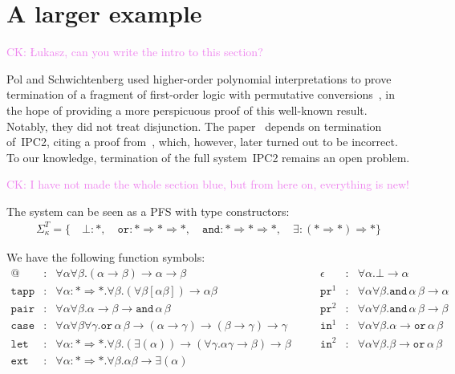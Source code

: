 \documentclass[a4paper,UKenglish,cleveref,autoref,numberwithinsect]{lipics-v2019}
\theoremstyle{definition}
\newcommand{\arrkind}{\Rightarrow}
\newcommand{\arrtype}{\rightarrow}
\newcommand{\proj}{\mathtt{pr}}
\newcommand{\CK}[1]{\textcolor{violet}{CK: #1}}
\begin{document}
\section{A larger example}\label{sec:examples}

\CK{\L ukasz, can you write the intro to this section?}

Pol and Schwichtenberg used higher-order polynomial interpretations to
prove termination of a fragment of first-order logic with permutative
conversions~\cite{PolSchwichtenberg1995}, in the hope of providing a
more perspicuous proof of this well-known result. Notably, they did
not treat disjunction. The paper~\cite{SorensenUrzyczyn2010} depends
on termination of~IPC2, citing a proof from~\cite{Wojdyga2008},
which, however, later turned out to be incorrect. To our knowledge,
termination of the full system~IPC2 remains an open problem.

\CK{I have not made the whole section blue, but from here on, everything
is new!}

The system can be seen as a PFS with type constructors:
\[
\begin{array}{c}
\Sigma^T_\kappa = \{\quad
  \bot : *,\quad
  \mathtt{or} : * \arrkind * \arrkind *,\quad
  \mathtt{and} : * \arrkind * \arrkind *,\quad
  \exists : (* \arrkind *) \arrkind *
  \}
\end{array}
\]

We have the following function symbols:
\[
\begin{array}{rclcrcl}
@ & : & \forall \alpha \forall \beta . (\alpha \arrtype \beta) \arrtype \alpha \arrtype \beta &
\quad &
\epsilon & : & \forall \alpha . \bot \arrtype \alpha \\

\mathtt{tapp} & : & \forall \alpha : * \arrkind * . \forall \beta .
  (\forall \beta [\alpha \beta]) \arrtype \alpha \beta &
\quad &
\proj^1 & : & \forall \alpha \forall \beta . \mathtt{and}\, \alpha\, \beta \arrtype \alpha \\

\mathtt{pair} & : & \forall \alpha \forall \beta . \alpha \arrtype \beta \arrtype
  \mathtt{and}\, \alpha\, \beta &
\quad &
\proj^2 & : & \forall \alpha \forall \beta . \mathtt{and}\, \alpha\, \beta \arrtype \beta \\

\mathtt{case} & : & \forall \alpha \forall \beta \forall \gamma . \mathtt{or}\, \alpha\, \beta \arrtype
  (\alpha \arrtype \gamma) \arrtype (\beta \arrtype \gamma) \arrtype \gamma &
\quad &
\mathtt{in}^1 & : & \forall \alpha \forall \beta . \alpha \arrtype
  \mathtt{or}\, \alpha\, \beta \\

\mathtt{let} & : & \forall \alpha : * \arrkind * . \forall \beta .
  (\exists (\alpha)) \arrtype
  (\forall \gamma . \alpha \gamma \arrtype \beta) \arrtype \beta &
\quad &
\mathtt{in}^2 & : & \forall \alpha \forall \beta . \beta \arrtype
  \mathtt{or}\, \alpha\, \beta \\

\mathtt{ext} & : & \forall \alpha : * \arrkind * . \forall \beta . \alpha \beta \arrtype
  \exists (\alpha)
\end{array}
\]
\end{document}
